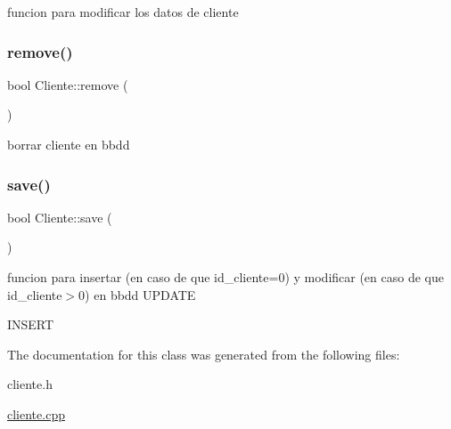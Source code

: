 funcion para modificar los datos de cliente\mbox{\label{classCliente_a8f80581958278a04ead3224e5c840178}} 
\subsubsection{\texorpdfstring{remove()}{remove()}}
{\footnotesize\ttfamily bool Cliente\+::remove (\begin{DoxyParamCaption}{ }\end{DoxyParamCaption})}

borrar cliente en bbdd \mbox{\label{classCliente_a7c66dee805434f57fa5fa1322fc99312}} 
\subsubsection{\texorpdfstring{save()}{save()}}
{\footnotesize\ttfamily bool Cliente\+::save (\begin{DoxyParamCaption}{ }\end{DoxyParamCaption})}

funcion para insertar (en caso de que id\+\_\+cliente=0) y modificar (en caso de que id\+\_\+cliente$>$0) en bbdd U\+P\+D\+A\+TE

I\+N\+S\+E\+RT 

The documentation for this class was generated from the following files\+:\begin{DoxyCompactItemize}
\item 
cliente.\+h\item 
\mbox{\hyperlink{cliente_8cpp}{cliente.\+cpp}}\end{DoxyCompactItemize}
